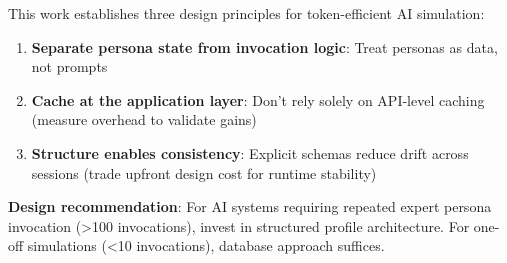 This work establishes three design principles for token-efficient AI simulation:

\begin{enumerate}
\item \textbf{Separate persona state from invocation logic}: Treat personas as data, not prompts
\item \textbf{Cache at the application layer}: Don't rely solely on API-level caching (measure overhead to validate gains)
\item \textbf{Structure enables consistency}: Explicit schemas reduce drift across sessions (trade upfront design cost for runtime stability)
\end{enumerate}

\textbf{Design recommendation}: For AI systems requiring repeated expert persona invocation (>100 invocations), invest in structured profile architecture. For one-off simulations (<10 invocations), database approach suffices.
